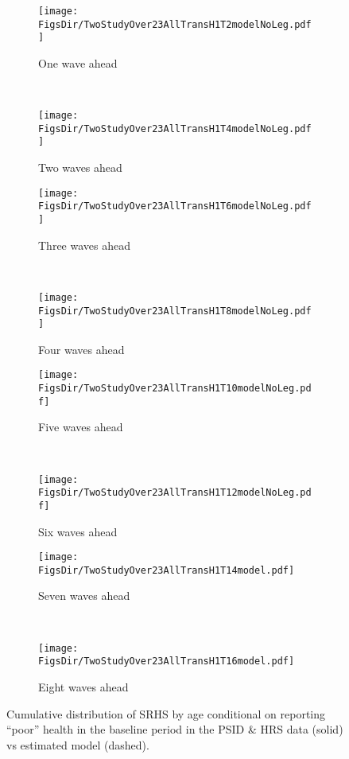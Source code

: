 \documentclass[12pt,pdftex,letterpaper]{article}
\newcommand{\RootDir}{..}
\newcommand{\FigsDir}{\RootDir/Figures}
\begin{document}
\begin{figure}
	\centering
	\begin{subfigure}[b]{0.48\textwidth}
		\texttt{[image: \\FigsDir/TwoStudyOver23AllTransH1T2modelNoLeg.pdf]}
		\caption{One wave ahead}\label{fig:Model1AheadPoor}
	\end{subfigure}
	~
	\begin{subfigure}[b]{0.48\textwidth}
		\texttt{[image: \\FigsDir/TwoStudyOver23AllTransH1T4modelNoLeg.pdf]}
		\caption{Two waves ahead}\label{fig:Model2AheadPoor}
	\end{subfigure}
	
	\begin{subfigure}[b]{0.48\textwidth}
		\texttt{[image: \\FigsDir/TwoStudyOver23AllTransH1T6modelNoLeg.pdf]}
		\caption{Three waves ahead}\label{fig:Model3AheadPoor}
	\end{subfigure}
	~
	\begin{subfigure}[b]{0.48\textwidth}
		\texttt{[image: \\FigsDir/TwoStudyOver23AllTransH1T8modelNoLeg.pdf]}
		\caption{Four waves ahead}\label{fig:Model4AheadPoor}
	\end{subfigure}
	
	\begin{subfigure}[b]{0.48\textwidth}
		\texttt{[image: \\FigsDir/TwoStudyOver23AllTransH1T10modelNoLeg.pdf]}
		\caption{Five waves ahead}\label{fig:Model5AheadPoor}
	\end{subfigure}
	~
	\begin{subfigure}[b]{0.48\textwidth}
		\texttt{[image: \\FigsDir/TwoStudyOver23AllTransH1T12modelNoLeg.pdf]}
		\caption{Six waves ahead}\label{fig:Model6AheadPoor}
	\end{subfigure}

	\begin{subfigure}[b]{0.48\textwidth}
		\texttt{[image: \\FigsDir/TwoStudyOver23AllTransH1T14model.pdf]}
		\caption{Seven waves ahead}\label{fig:Model7AheadPoor}
	\end{subfigure}
	~
	\begin{subfigure}[b]{0.48\textwidth}
		\texttt{[image: \\FigsDir/TwoStudyOver23AllTransH1T16model.pdf]}
		\caption{Eight waves ahead}\label{fig:Model8AheadPoor}
	\end{subfigure}
	\caption{Cumulative distribution of SRHS by age conditional on reporting ``poor'' health in the baseline period in the PSID \& HRS data (solid) vs estimated model (dashed).}\label{fig:ModelTransPR}
\end{figure}
\end{document}
